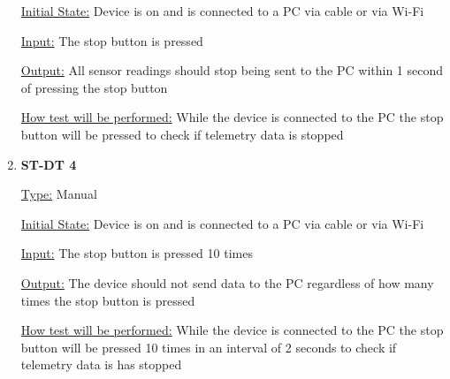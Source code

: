 \documentclass[12pt, titlepage]{article}
\begin{document}
\begin{enumerate}
  \underline{Initial State:} Device is on and is connected to a PC via cable or via Wi-Fi
            
  \underline{Input:} The stop button is pressed
            
  \underline{Output:} All sensor readings should stop being sent to the PC within 1 second of pressing the stop button
  
            
  \underline{How test will be performed:} While the device is connected to the PC the stop button will be pressed to check if telemetry data is stopped\\

  \item{\bf{ST-DT 4}}
  
  \underline{Type:} Manual
            
  \underline{Initial State:} Device is on and is connected to a PC via cable or via Wi-Fi
            
  \underline{Input:} The stop button is pressed 10 times
            
  \underline{Output:} The device should not send data to the PC regardless of how many times the stop button is pressed
  
            
  \underline{How test will be performed:} While the device is connected to the PC the stop button will be pressed 10 times in an interval of 2 seconds to check if telemetry data is has stopped\\

  \end{enumerate}
\end{document}

